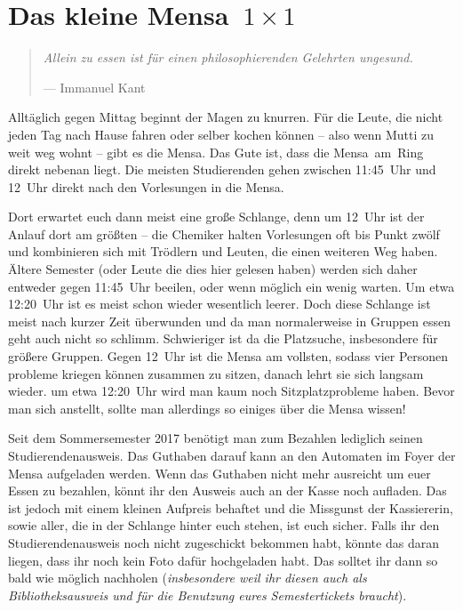 \section[Das kleine Mensa~1~×~1]{\boldmath Das kleine Mensa~${1 \times 1}$}
\begin{multicols*}{2}
\begin{quote}
	\textit{Allein zu essen ist für einen philosophierenden Gelehrten ungesund.}
	
	\hfill--- Immanuel Kant
\end{quote}

Alltäglich gegen Mittag beginnt der Magen zu knurren.
Für die Leute, die nicht jeden Tag nach Hause fahren oder selber kochen können -- also wenn Mutti zu weit weg wohnt -- gibt es die Mensa.
Das Gute ist, dass die Mensa~am~Ring direkt nebenan liegt.
Die meisten Studierenden gehen zwischen 11:45~Uhr und 12~Uhr direkt nach den Vorlesungen in die Mensa.

Dort erwartet euch dann meist eine große Schlange, denn um 12~Uhr ist der Anlauf dort am größten – die Chemiker halten Vorlesungen oft bis Punkt zwölf und kombinieren sich mit Trödlern und Leuten, die einen weiteren Weg haben. Ältere Semester (oder Leute die dies hier gelesen haben) werden sich daher entweder gegen 11:45~Uhr beeilen, oder wenn möglich ein wenig warten. Um etwa 12:20~Uhr ist es meist schon wieder wesentlich leerer.
Doch diese Schlange ist meist nach kurzer Zeit überwunden und da man normalerweise in Gruppen essen geht auch nicht so schlimm. Schwieriger ist da die Platzsuche, insbesondere für größere Gruppen. Gegen 12~Uhr ist die Mensa am vollsten, sodass vier Personen probleme kriegen können zusammen zu sitzen, danach lehrt sie sich langsam wieder. um etwa 12:20~Uhr wird man kaum noch Sitzplatzprobleme haben.
Bevor man sich anstellt, sollte man allerdings so einiges über die Mensa wissen!

Seit dem Sommersemester 2017 benötigt man zum Bezahlen lediglich seinen Studierendenausweis.
Das Guthaben darauf kann an den Automaten im Foyer der Mensa aufgeladen werden.
Wenn das Guthaben nicht mehr ausreicht um euer Essen zu bezahlen, könnt ihr den Ausweis auch an der Kasse noch aufladen. 
Das ist jedoch mit einem kleinen Aufpreis behaftet und die Missgunst der Kassiererin, sowie aller, die in der Schlange hinter euch stehen, ist euch sicher.
Falls ihr den Studierendenausweis noch nicht zugeschickt bekommen habt, könnte das daran liegen, dass ihr noch kein Foto dafür hochgeladen habt.
Das solltet ihr dann so bald wie möglich nachholen (\textit{insbesondere weil ihr diesen auch als Bibliotheksausweis und für die Benutzung eures Semestertickets braucht}).


\end{multicols*}
